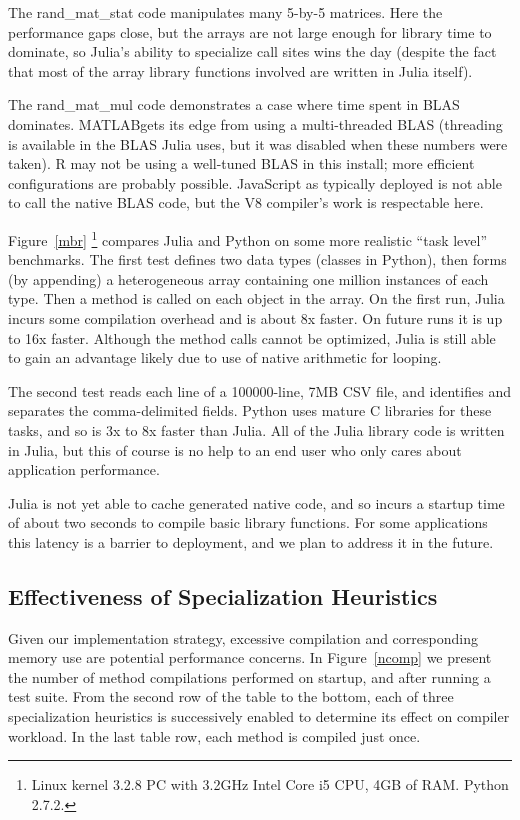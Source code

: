 \documentclass[9pt]{sigplanconf}
\begin{document}
The rand\_mat\_stat code manipulates many 5-by-5 matrices. Here the
performance gaps close, but the arrays are not large enough for
library time to dominate, so Julia's ability to specialize call sites
wins the day (despite the fact that most of the array library functions
involved are written in Julia itself).

The rand\_mat\_mul code demonstrates a case where time spent in BLAS \cite{blas}
dominates. MATLAB\textregistered gets its edge from using a
multi-threaded BLAS (threading is available in the BLAS Julia uses,
but it was disabled when these numbers were taken). R may not be using
a well-tuned BLAS in this install; more efficient configurations are
probably possible.
JavaScript as typically deployed is not able to call the native BLAS code,
but the V8 compiler's work is respectable here.

Figure~\ref{mbr}
\footnote{
Linux kernel 3.2.8 PC with 3.2GHz Intel Core i5 CPU, 4GB of RAM.
Python 2.7.2.
}
compares Julia and Python on some
more realistic ``task level'' benchmarks. The first test defines two
data types (classes in Python), then forms (by appending) a heterogeneous
array containing one million instances of each type. Then a method is called
on each object in the array. On the first run, Julia incurs some compilation
overhead and is about 8x faster. On future runs it is up to 16x faster.
Although the method calls cannot be optimized, Julia is still able to
gain an advantage likely due to use of native arithmetic for looping.

The second test reads each line of a 100000-line, 7MB CSV file, and
identifies and separates the comma-delimited fields. Python uses mature
C libraries for these tasks, and so is 3x to 8x faster than Julia. All of
the Julia library code is written in Julia, but this of course is no help
to an end user who only cares about application performance.

Julia is not yet able to cache generated native code, and so incurs a
startup time of about two seconds to compile basic library functions.
For some applications this latency is a barrier to deployment, and we plan
to address it in the future.


\subsection{Effectiveness of Specialization Heuristics}

Given our implementation strategy, excessive compilation and corresponding
memory use are potential performance concerns. In Figure~\ref{ncomp}
we present the number of method compilations performed on startup, and
after running a test suite. From the second row of the table to the bottom,
each of three specialization heuristics is successively enabled to
determine its effect on compiler workload. In the last table row, each
method is compiled just once.
\end{document}
